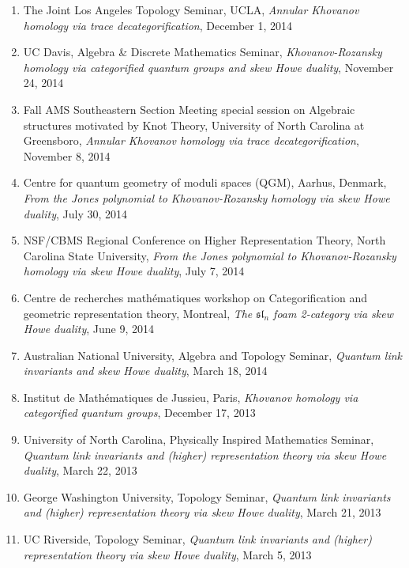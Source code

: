 \documentclass[10pt]{article}
\begin{document}
\begin{enumerate}
\item The Joint Los Angeles Topology Seminar, UCLA, 
\emph{Annular Khovanov homology via trace decategorification},
December 1, 2014

\item UC Davis, Algebra \& Discrete Mathematics Seminar,
\emph{Khovanov-Rozansky homology via categorified quantum groups and skew Howe duality},
November 24, 2014

\item Fall AMS Southeastern Section Meeting special session on 
Algebraic structures motivated by Knot Theory, 
University of North Carolina at Greensboro, 
\emph{Annular Khovanov homology via trace decategorification},
November 8, 2014

\item Centre for quantum geometry of moduli spaces (QGM), Aarhus, Denmark,
\emph{From the Jones polynomial to Khovanov-Rozansky homology via skew Howe duality}, 
July 30, 2014

\item NSF/CBMS Regional Conference on Higher Representation Theory, 
North Carolina State University, 
\emph{From the Jones polynomial to Khovanov-Rozansky homology via skew Howe duality}, 
July 7, 2014

\item Centre de recherches math\'{e}matiques workshop on 
Categorification and geometric representation theory, Montreal,
\emph{The $\mathfrak{sl}_n$ foam 2-category via skew Howe duality}, June 9, 2014

\item Australian National University, Algebra and Topology Seminar, 
\emph{Quantum link invariants and skew Howe duality}, March 18, 2014

\item Institut de Math\'{e}matiques de Jussieu, Paris, 
\emph{Khovanov homology via categorified quantum groups},
December 17, 2013

\item University of North Carolina, Physically Inspired Mathematics Seminar, 
\emph{Quantum link invariants and (higher) representation theory 
via skew Howe duality}, March 22, 2013

\item George Washington University, Topology Seminar, 
\emph{Quantum link invariants and (higher) representation theory 
via skew Howe duality}, March 21, 2013

\item UC Riverside, Topology Seminar, 
\emph{Quantum link invariants and (higher) representation theory 
via skew Howe duality}, March 5, 2013


\end{enumerate}
\end{document}
